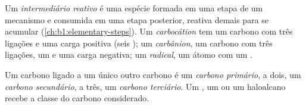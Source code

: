\begin{definition}\label{def:b1:electronic-effects:intermediates}
Um \emph{intermediário reativo} é uma espécie
formada em uma etapa de um mecanismo e consumida em uma etapa posterior,
reativa demais para se acumular (\cref{ch:b1:elementary-steps}). Um
\emph{carbocátion} tem um carbono com três ligações e uma
carga positiva (seis ); um
\emph{carbânion}, um carbono com três ligações, um  e uma carga negativa; um \emph{radical}, um átomo
com um .
\end{definition}

\begin{definition}\label{def:b1:electronic-effects:carbon-class}
Um carbono ligado a um único outro carbono é um \emph{carbono
primário}, a dois, um \emph{carbono
secundário}, a três, um \emph{carbono
terciário}. Um , um  ou um
haloalcano recebe a classe do carbono considerado.
\end{definition}

